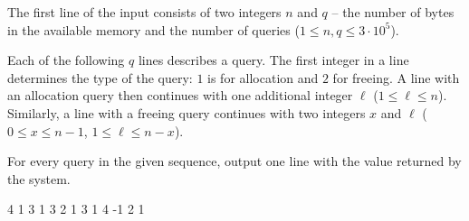 The first line of the input consists of two integers $n$ and $q$ -- the number
of bytes in the available memory and the number of queries ($1 \leq n, q \leq
3\cdot 10^5$).

Each of the following $q$ lines describes a query. The first integer in a line
determines the type of the query: $1$ is for allocation and $2$ for freeing. A
line with an allocation query then continues with one additional integer $\ell$
($1 \leq \ell \leq n$). Similarly, a line with a freeing query continues with
two integers $x$ and $\ell$ ($0 \leq x \leq n-1$, $1 \leq \ell \leq n-x$).



For every query in the given sequence, output one line with the value returned
by the system.



 4
1 3
1 3
2 1 3
1 4
-1
2
1
\sampleEND



